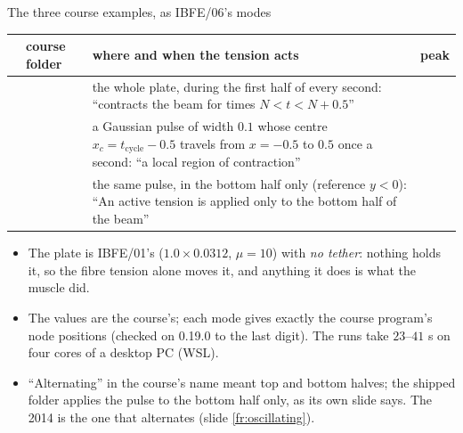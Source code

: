 \documentclass[aspectratio=169,11pt]{beamer}
\begin{document}
\begin{frame}{The three course examples, as IBFE/06's modes}
\label{fr:modes}
\scriptsize
\begin{tabular}{@{}L{0.15\textwidth}L{0.24\textwidth}L{0.30\textwidth}L{0.21\textwidth}@{}}
\toprule
{} & course folder & where and when the tension acts & peak \\
\midrule
{} &  & the whole plate, during the first half of every second: ``contracts the beam for times $N < t < N + 0.5$'' &  \\
 &  & a Gaussian pulse of width $0.1$ whose centre $x_c = t_{\mathrm{cycle}} - 0.5$ travels from $x = -0.5$ to $0.5$ once a second: ``a local region of contraction'' &  \\
 &  & the same pulse, in the bottom half only (reference $y < 0$): ``An active tension is applied only to the bottom half of the beam'' &  \\
\bottomrule
\end{tabular}

\medskip
\begin{itemize}
  \item The plate is IBFE/01's ($1.0\times0.0312$, $\mu = 10$) with \emph{no tether}: nothing holds it, so the fibre tension alone moves it, and anything it does is what the muscle did.
  \item The values are the course's; each mode gives exactly the course program's node positions (checked on 0.19.0 to the last digit). The runs take $23$--$41$ s on four cores of a desktop PC (WSL).
  \item ``Alternating'' in the course's name meant top and bottom halves; the shipped folder applies the pulse to the bottom half only, as its own slide says. The 2014  is the one that alternates (slide \ref{fr:oscillating}).
\end{itemize}
\end{frame}
\end{document}
